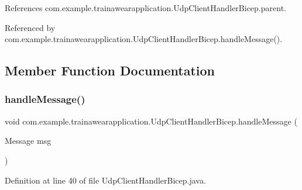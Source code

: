 References com.\+example.\+trainawearapplication.\+Udp\+Client\+Handler\+Bicep.\+parent.



Referenced by com.\+example.\+trainawearapplication.\+Udp\+Client\+Handler\+Bicep.\+handle\+Message().



\subsection{Member Function Documentation}
\mbox{\label{classcom_1_1example_1_1trainawearapplication_1_1_udp_client_handler_bicep_a083761d7050084ba7f64723dc178487a}} 
\subsubsection{\texorpdfstring{handleMessage()}{handleMessage()}}
{\footnotesize\ttfamily void com.\+example.\+trainawearapplication.\+Udp\+Client\+Handler\+Bicep.\+handle\+Message (\begin{DoxyParamCaption}\item[{Message}]{msg }\end{DoxyParamCaption})}



Definition at line 40 of file Udp\+Client\+Handler\+Bicep.\+java.


